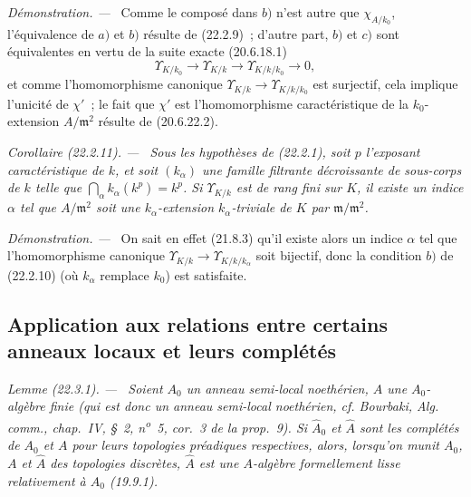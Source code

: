 \documentclass[10pt,oneside]{book}
\makeatletter
\newcommand{\setmanualcurrentlabel}[1]{\def\@currentlabel{#1}}
\newcommand{\oldpage}[2][]{%
  \setcounter{footnote}{0}%
  \marginpar{\scriptsize\textbf{#1}~|~#2}\ignorespaces}
\newenvironment{corollary}[1][]{%
  \setmanualcurrentlabel{#1}\par\medskip\noindent\itshape Corollaire (#1). ---\ }{\par}
\newenvironment{lemma}[1][]{%
  \setmanualcurrentlabel{#1}\par\medskip\noindent\itshape Lemme (#1). ---\ }{\par}
\newenvironment{proof}{%
  \par\medskip\noindent\textit{Démonstration. ---\ }}{\par}
\makeatother
\begin{document}
\begin{proof}
Comme le composé dans $b)$ n'est autre que $\chi_{A/k_0}$, l'équivalence de
$a)$ et $b)$ résulte de (22.2.9)~; d'autre part, $b)$ et $c)$ sont
équivalentes en vertu de la suite exacte (20.6.18.1)
\[
  \Upsilon_{K/k_0}\longrightarrow\Upsilon_{K/k}
  \longrightarrow\Upsilon_{K/k/k_0}\longrightarrow0,
\]
et comme l'homomorphisme canonique
$\Upsilon_{K/k}\to\Upsilon_{K/k/k_0}$ est surjectif, cela implique l'unicité
de $\chi'$~; le fait que $\chi'$ est l'homomorphisme caractéristique de la
$k_0$-extension $A/\mathfrak m^2$ résulte de (20.6.22.2).
\end{proof}

\begin{corollary}[22.2.11]
\label{0.22.2.11-fr}
Sous les hypothèses de (22.2.1), soit $p$ l'exposant caractéristique de $k$,
et soit $(k_\alpha)$ une famille filtrante décroissante de sous-corps de $k$
telle que $\bigcap_\alpha k_\alpha(k^p)=k^p$. Si $\Upsilon_{K/k}$ est de rang
fini sur $K$, il existe un indice $\alpha$ tel que $A/\mathfrak m^2$ soit une
$k_\alpha$-extension $k_\alpha$-triviale de $K$ par
$\mathfrak m/\mathfrak m^2$.
\end{corollary}

\begin{proof}
On sait en effet (21.8.3) qu'il existe alors un indice $\alpha$ tel que
l'homomorphisme canonique
$\Upsilon_{K/k}\to\Upsilon_{K/k/k_\alpha}$ soit bijectif, donc la condition
$b)$ de (22.2.10) (où $k_\alpha$ remplace $k_0$) est satisfaite.
\end{proof}
\oldpage[0\textsubscript{IV-1}]{191}

\subsection{Application aux relations entre certains anneaux locaux et leurs complétés}
\label{subsection:0.22.3-fr}

\begin{lemma}[22.3.1]
\label{0.22.3.1-fr}
Soient $A_0$ un anneau semi-local noethérien, $A$ une $A_0$-algèbre finie
(qui est donc un anneau semi-local noethérien, cf. Bourbaki,
\emph{Alg. comm.}, chap.~IV, §~2, n\textsuperscript{o}~5, cor.~3 de la
prop.~9). Si $\widehat A_0$ et $\widehat A$ sont les complétés de $A_0$ et
$A$ pour leurs topologies préadiques respectives, alors, lorsqu'on munit
$A_0$, $A$ et $\widehat A$ des topologies discrètes, $\widehat A$ est une
$A$-algèbre formellement lisse relativement à $A_0$ (19.9.1).
\end{lemma}
\end{document}

